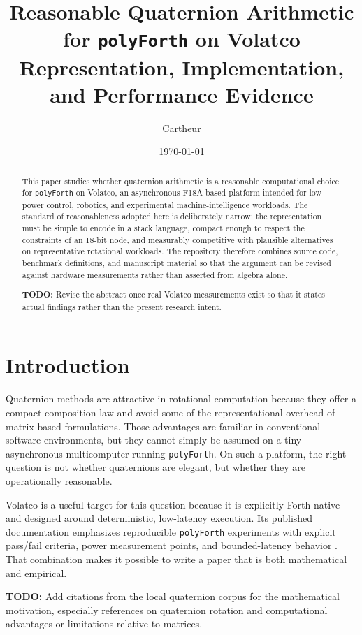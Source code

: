 \documentclass[11pt]{article}
\title{Reasonable Quaternion Arithmetic for \texttt{polyForth} on Volatco\\
\large Representation, Implementation, and Performance Evidence}
\author{Cartheur}
\date{\today}
\newcommand{\todoitem}[1]{%
  \par\noindent\textbf{TODO:} #1\par
}
\begin{document}
\maketitle

\begin{abstract}
This paper studies whether quaternion arithmetic is a reasonable computational
choice for \texttt{polyForth} on Volatco, an asynchronous F18A-based platform
intended for low-power control, robotics, and experimental machine-intelligence
workloads. The standard of reasonableness adopted here is deliberately narrow:
the representation must be simple to encode in a stack language, compact enough
to respect the constraints of an 18-bit node, and measurably competitive with
plausible alternatives on representative rotational workloads. The repository
therefore combines source code, benchmark definitions, and manuscript material
so that the argument can be revised against hardware measurements rather than
asserted from algebra alone.
\todoitem{Revise the abstract once real Volatco measurements exist so that it
states actual findings rather than the present research intent.}
\end{abstract}

\section{Introduction}

Quaternion methods are attractive in rotational computation because they offer a
compact composition law and avoid some of the representational overhead of
matrix-based formulations. Those advantages are familiar in conventional
software environments, but they cannot simply be assumed on a tiny asynchronous
multicomputer running \texttt{polyForth}. On such a platform, the right
question is not whether quaternions are elegant, but whether they are
operationally reasonable.

Volatco is a useful target for this question because it is explicitly
Forth-native and designed around deterministic, low-latency execution. Its
published documentation emphasizes reproducible \texttt{polyForth} experiments
with explicit pass/fail criteria, power measurement points, and bounded-latency
behavior \cite{volatco-site,volatco-docs}. That combination makes it possible
to write a paper that is both mathematical and empirical.

\todoitem{Add citations from the local quaternion corpus for the mathematical
motivation, especially references on quaternion rotation and computational
advantages or limitations relative to matrices.}
\end{document}
